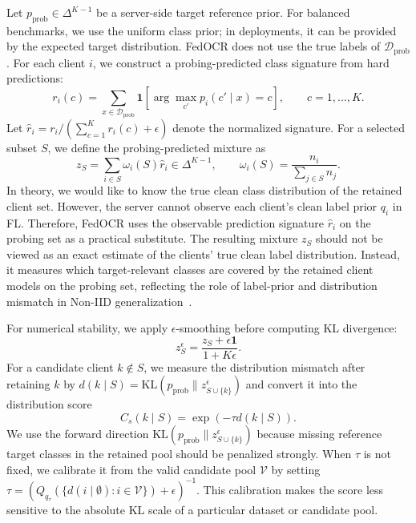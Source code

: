 ﻿\documentclass[conference]{IEEEtran}
\theoremstyle{definition}
\theoremstyle{remark}
\begin{document}
Let $p_{\mathrm{prob}}\in\Delta^{K-1}$ be a server-side target reference prior.
For balanced benchmarks, we use the uniform class prior; in deployments, it can be provided by the expected target distribution.
FedOCR does not use the true labels of $\mathcal D_{\mathrm{prob}}$.
For each client $i$, we construct a probing-predicted class signature from hard predictions:
\begin{equation}
\label{eq:predictive_signature_main}
r_i(c)
=
\sum_{x\in\mathcal D_{\mathrm{prob}}}
\mathbf{1}
\left[
\arg\max_{c'}p_i(c'\mid x)=c
\right],
\qquad c=1,\dots,K.
\end{equation}
Let $\hat r_i=r_i/(\sum_{c=1}^{K}r_i(c)+\epsilon)$ denote the normalized signature.
For a selected subset $S$, we define the probing-predicted mixture as
\begin{equation}
\label{eq:subset_signature_main}
z_S
=
\sum_{i\in S}
\omega_i(S)\hat r_i
\in\Delta^{K-1},
\qquad
\omega_i(S)=\frac{n_i}{\sum_{j\in S}n_j}.
\end{equation}
In theory, we would like to know the true clean class distribution of the retained client set.
However, the server cannot observe each client's clean label prior $q_i$ in FL.
Therefore, FedOCR uses the observable prediction signature $\hat r_i$ on the probing set as a practical substitute.
The resulting mixture $z_S$ should not be viewed as an exact estimate of the clients' true clean label distribution.
Instead, it measures which target-relevant classes are covered by the retained client models on the probing set, reflecting the role of label-prior and distribution mismatch in Non-IID generalization~\cite{lipton2018labelshift,hsu2019measuring,zhu2021survey}.

For numerical stability, we apply $\epsilon$-smoothing before computing KL divergence:
\begin{equation}
	z_S^\epsilon=\frac{z_S+\epsilon\mathbf 1}{1+K\epsilon}.
\end{equation}
For a candidate client $k\notin S$, we measure the distribution mismatch after retaining $k$ by $d(k\mid S)=\mathrm{KL}(p_{\mathrm{prob}}\|z_{S\cup\{k\}}^\epsilon)$ and convert it into the distribution score
\begin{equation}
\label{eq:distribution_score}
C_s(k\mid S)
=
\exp\!\left(-\tau d(k\mid S)\right).
\end{equation}
We use the forward direction $\mathrm{KL}(p_{\mathrm{prob}}\|z_{S\cup\{k\}}^\epsilon)$ because missing reference target classes in the retained pool should be penalized strongly.
When $\tau$ is not fixed, we calibrate it from the valid candidate pool $\mathcal V$ by setting $\tau=(Q_{q_\tau}(\{d(i\mid\emptyset):i\in\mathcal V\})+\epsilon)^{-1}$.
This calibration makes the score less sensitive to the absolute KL scale of a particular dataset or candidate pool.
\end{document}
